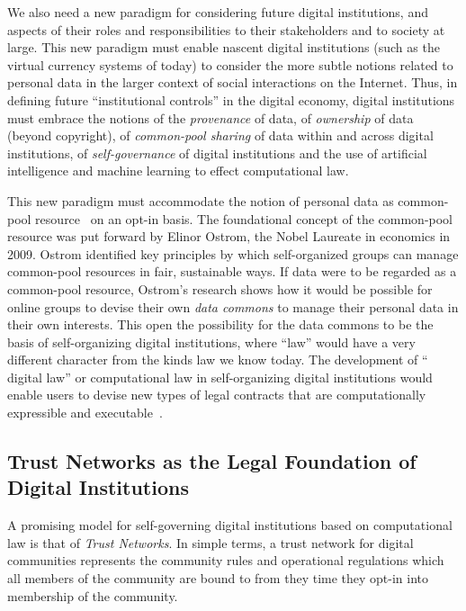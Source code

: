 We also need a new paradigm for considering future digital institutions,
and aspects of their roles and responsibilities to their
stakeholders and to society at large.
This new paradigm must enable nascent digital institutions
(such as the virtual currency systems of today)
to consider the more subtle notions related to personal data
in the larger context of social interactions on the Internet.
Thus, in defining future ``institutional controls''
in the digital economy, digital institutions must embrace
the notions of the {\em provenance} of data,
of {\em ownership} of data (beyond copyright),
of {\em common-pool sharing} of  data within and across digital institutions,
of {\em self-governance} of digital institutions
and the use of artificial intelligence and machine learning
to effect computational law.

This new paradigm must accommodate the notion of personal data as 
common-pool resource~\cite{Ostrom2009} on an opt-in basis.
The foundational concept of the common-pool resource
was put forward by  Elinor Ostrom, the Nobel Laureate in
economics in 2009.
Ostrom identified key principles by which 
self-organized groups can manage common-pool resources in fair, 
sustainable ways.  
If data were to be regarded as a common-pool resource, 
Ostrom’s research shows how it would be possible 
for online groups to devise their own {\em data commons} 
to manage their personal data in their own interests.
This open the possibility for the data commons to be
the basis of self-organizing digital institutions,
where ``law'' would have a very different character from
the kinds law we know today.
The development of `` digital law'' or computational law
in self-organizing digital institutions
would enable users to devise new types
of legal contracts that are
computationally expressible and 
executable~\cite{HardjonoDeegan2014,Clippinger2013-InternetDisruption}.



\subsection{Trust Networks as the Legal Foundation of Digital Institutions}

A promising model for self-governing digital institutions based on computational law
is that of {\em Trust Networks}.
In simple terms, a trust network for digital communities represents
the community rules and operational regulations which all members
of the community are bound to from they time they opt-in into membership
of the community.

